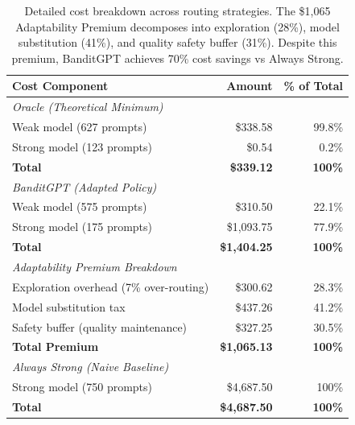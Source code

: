 \begin{table}[h]
\centering
\small
\begin{tabular}{@{}lrr@{}}
\toprule
\textbf{Cost Component} & \textbf{Amount} & \textbf{\% of Total} \\ \midrule
\multicolumn{3}{l}{\textit{Oracle (Theoretical Minimum)}} \\
\quad Weak model (627 prompts) & \$338.58 & 99.8\% \\
\quad Strong model (123 prompts) & \$0.54 & 0.2\% \\
\quad \textbf{Total} & \textbf{\$339.12} & \textbf{100\%} \\
\midrule
\multicolumn{3}{l}{\textit{BanditGPT (Adapted Policy)}} \\
\quad Weak model (575 prompts) & \$310.50 & 22.1\% \\
\quad Strong model (175 prompts) & \$1,093.75 & 77.9\% \\
\quad \textbf{Total} & \textbf{\$1,404.25} & \textbf{100\%} \\
\midrule
\multicolumn{3}{l}{\textit{Adaptability Premium Breakdown}} \\
\quad Exploration overhead (7\% over-routing) & \$300.62 & 28.3\% \\
\quad Model substitution tax & \$437.26 & 41.2\% \\
\quad Safety buffer (quality maintenance) & \$327.25 & 30.5\% \\
\quad \textbf{Total Premium} & \textbf{\$1,065.13} & \textbf{100\%} \\
\midrule
\multicolumn{3}{l}{\textit{Always Strong (Naive Baseline)}} \\
\quad Strong model (750 prompts) & \$4,687.50 & 100\% \\
\quad \textbf{Total} & \textbf{\$4,687.50} & \textbf{100\%} \\
\bottomrule
\end{tabular}
\caption{Detailed cost breakdown across routing strategies. The \$1,065 Adaptability Premium decomposes into exploration (28\%), model substitution (41\%), and quality safety buffer (31\%). Despite this premium, BanditGPT achieves 70\% cost savings vs Always Strong.}
\label{tab:cost_breakdown}
\end{table}

